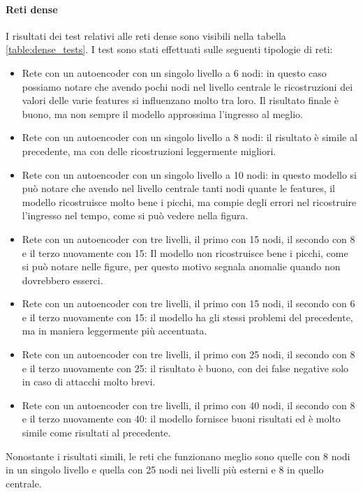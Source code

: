 \paragraph{Reti dense} I risultati dei test relativi alle reti dense sono visibili nella tabella \ref{table:dense_tests}.
I test sono stati effettuati sulle seguenti tipologie di reti:
\begin{itemize}
    \item Rete con un autoencoder con un singolo livello a 6 nodi: in questo caso possiamo notare che avendo pochi nodi nel livello centrale le ricostruzioni dei valori delle varie features si influenzano molto tra loro. Il risultato finale è buono, ma non sempre il modello approssima l'ingresso al meglio.
    \item Rete con un autoencoder con un singolo livello a 8 nodi: il risultato è simile al precedente, ma con delle ricostruzioni leggermente migliori.
    \item Rete con un autoencoder con un singolo livello a 10 nodi: in questo modello si può notare che avendo nel livello centrale tanti nodi quante le features, il modello ricostruisce molto bene i picchi, ma compie degli errori nel ricostruire l'ingresso nel tempo, come si può vedere nella figura.
    \item Rete con un autoencoder con tre livelli, il primo con 15 nodi, il secondo con 8 e il terzo nuovamente con 15: Il modello non ricostruisce bene i picchi, come si può notare nelle figure, per questo motivo segnala anomalie quando non dovrebbero esserci.
    \item Rete con un autoencoder con tre livelli, il primo con 15 nodi, il secondo con 6 e il terzo nuovamente con 15: il modello ha gli stessi problemi del precedente, ma in maniera leggermente più accentuata.
    \item Rete con un autoencoder con tre livelli, il primo con 25 nodi, il secondo con 8 e il terzo nuovamente con 25: il risultato è buono, con dei false negative solo in caso di attacchi molto brevi.
    \item Rete con un autoencoder con tre livelli, il primo con 40 nodi, il secondo con 8 e il terzo nuovamente con 40: il modello fornisce buoni risultati ed è molto simile come risultati al precedente.


\end{itemize}

Nonostante i risultati simili, le reti che funzionano meglio sono quelle con 8 nodi in un singolo livello e quella con 25 nodi nei livelli più esterni e 8 in quello centrale.



